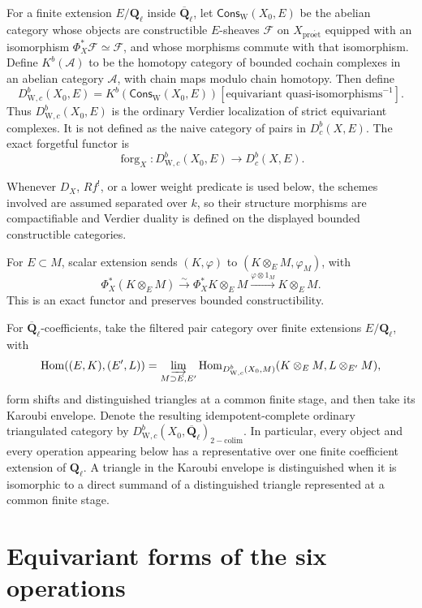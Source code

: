 \documentclass[10pt]{article}
\theoremstyle{definition}
\newcommand{\Ql}{\mathbf Q_\ell}
\newcommand{\Qlb}{\overline{\mathbf Q}_\ell}
\newcommand{\Dbc}{D^b_c}
\newcommand{\WeilD}{D^b_{\mathrm W,c}}
\begin{document}
For a finite extension \(E/\Ql\) inside \(\Qlb\), let
\(\mathsf{Cons}_{\mathrm W}(X_0,E)\) be the abelian category whose objects
are constructible \(E\)-sheaves \(\mathcal F\) on \(X_{\mathrm{pro\acute
et}}\) equipped with an isomorphism
\(\Phi_X^*\mathcal F\simeq\mathcal F\), and whose morphisms commute with that
isomorphism.  Define
\(K^b(\mathcal A)\) to be the homotopy category of bounded cochain complexes
in an abelian category \(\mathcal A\), with chain maps modulo chain homotopy.
Then define
\[
 \WeilD(X_0,E)
 =K^b(\mathsf{Cons}_{\mathrm W}(X_0,E))
       [\text{equivariant quasi-isomorphisms}^{-1}].
\]
Thus \(\WeilD(X_0,E)\) is the ordinary Verdier localization of strict
equivariant complexes.  It is not defined as the naive category of pairs in
\(\Dbc(X,E)\).  The exact forgetful functor is
\[
\operatorname{forg}_X:\WeilD(X_0,E)\longrightarrow\Dbc(X,E).
\]

Whenever \(D_X\), \(Rf^!\), or a lower weight predicate is used below, the
schemes involved are assumed separated over \(k\), so their structure
morphisms are compactifiable and Verdier duality is defined on the displayed
bounded constructible categories.

For \(E\subset M\), scalar extension sends \((K,\varphi)\) to
\((K\otimes_EM,\varphi_M)\), with
\[
 \Phi_X^*(K\otimes_EM)\xrightarrow{\sim}
 \Phi_X^*K\otimes_EM\xrightarrow{\varphi\otimes1_M}K\otimes_EM.
\]
This is an exact functor and preserves bounded constructibility.

For \(\Qlb\)-coefficients, take the filtered pair category over finite
extensions \(E/\Ql\), with
\[
 \operatorname{Hom}((E,K),(E',L))
 =\varinjlim_{M\supset E,E'}
 \operatorname{Hom}_{\WeilD(X_0,M)}
       (K\otimes_EM,L\otimes_{E'}M),
\]
form shifts and distinguished triangles at a common finite stage, and then
take its Karoubi envelope.  Denote the resulting idempotent-complete ordinary
triangulated category by
\(\WeilD(X_0,\Qlb)_{\mathrm{2-colim}}\).  In particular,
every object and every operation appearing below has a representative over
one finite coefficient extension of \(\Ql\).
A triangle in the Karoubi envelope is distinguished when it is isomorphic
to a direct summand of a distinguished triangle represented at a common
finite stage.

\section{Equivariant forms of the six operations}
\end{document}
